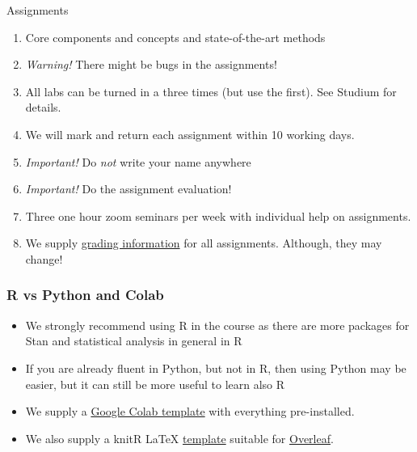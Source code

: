 \documentclass[10pt,handout]{beamer}
\begin{document}
\begin{frame}{Assignments}

\begin{enumerate}
\item Core components and concepts and state-of-the-art methods\pause
\item \emph{Warning!} There might be bugs in the assignments!\pause
\item All labs can be turned in a three times (but use the first). See Studium for details.\pause
\item We will mark and return each assignment within 10 working days.\pause
\item \emph{Important!} Do \emph{not} write your name anywhere\pause
\item \emph{Important!} Do the assignment evaluation!\pause
\item Three one hour zoom seminars per week with individual help on assignments.\pause
\item We supply \href{https://github.com/MansMeg/BSDA/tree/main/grading}{grading information} for all assignments. Although, they may change!
\end{enumerate}
\end{frame}

\begin{frame}
  \frametitle{R vs Python and Colab}

  \begin{itemize}
    \item We strongly recommend using R in the course as there are more
    packages for Stan and statistical analysis in general in R\pause
    \item If you are already fluent in Python, but not in R, then using Python may be easier, but it can still be more useful to learn also R\pause
    \item We supply a \href{https://github.com/MansMeg/BSDA/blob/main/templates/bsda_colab_template.ipynb}{Google Colab template} with everything pre-installed.
    \pause
    \item We also supply a knitR \LaTeX{} \href{https://github.com/MansMeg/BSDA/blob/main/templates/assignment_template.Rtex}{template} suitable for \href{https://www.overleaf.com/}{Overleaf}.
  \end{itemize}

\end{frame}
\end{document}
